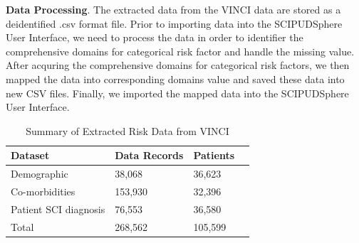 \documentclass{amia}
\begin{document}
{\bf Data Processing}. The extracted data from the VINCI data are stored as a deidentified .csv format file. Prior to importing data into the SCIPUDSphere User Interface, we need to process the data in order to identifier the comprehensive domains for categorical risk factor and handle the missing value. After acquring the comprehensive domains for categorical risk factors, we then mapped the data into corresponding domains value and saved these data into new CSV files. Finally, we imported the mapped data into the SCIPUDSphere User Interface.

\begin{table}[!ht]
\centering
\caption{Summary of Extracted Risk Data from VINCI}
  \begin{tabular}{|l|l|l|l|}
  \hline
    \textbf{Dataset}  & \textbf{Data Records} & \textbf{Patients} \\ \hline
    Demographic            &  38,068  & 36,623 \\ \hline
    Co-morbidities         & 153,930  & 32,396 \\ \hline
    Patient SCI diagnosis  &  76,553  & 36,580 \\ \hline
    Total & 268,562 & 105,599 \\ \hline
  \end{tabular}
\end{table}

\end{document}
